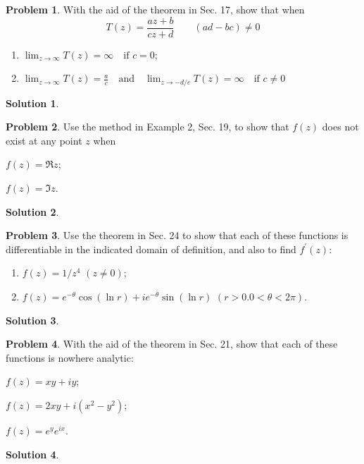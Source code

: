 \documentclass[10pt]{article}
\theoremstyle{definition}
\newtheorem{problem}{Problem}
\newtheorem{soln}{Solution}
\newcommand{\primed}[1]{#1^\prime}
\begin{document}
\begin{problem}
With the aid of the theorem in Sec. 17, show that when
$$T(z)=\frac{az+b}{cz+d}\qquad (ad-bc)\neq0$$
\begin{enumerate}[label=(\alph*)]
  \item $\lim_{z\to\infty}T(z)=\infty\quad \text{if } c=0$;
  \item $\lim_{z\to\infty}T(z)=\frac{a}{c}\quad\text{and}\quad\lim_{z\to-d/c}T(z)=\infty\quad\text{if } c\neq 0$
\end{enumerate}
\end{problem}
\begin{soln}
\end{soln}

\begin{problem}
Use the method in Example 2, Sec. 19, to show that $f(z)$ does not exist at any point
$z$ when
\begin{enumerate*}[label=(\alph*)]
  \item $f(z)=\Re z$;\qquad~
  \item $f(z)=\Im z$.
\end{enumerate*}
\end{problem}
\begin{soln}
\end{soln}

\begin{problem}
Use the theorem in Sec. 24 to show that each of these functions is differentiable in the
indicated domain of definition, and also to find $\primed{f}(z)$:
\begin{enumerate}[label=(\alph*)]
  \item $f(z)=1/z^4$ $(z\neq 0)$;
  \item $f(z)=e^{-\theta}\cos\left(\ln r\right)+ie^{-\theta}\sin\left(\ln r\right)$ $(r>0. 0<\theta<2\pi)$.
\end{enumerate}
\end{problem}
\begin{soln}
\end{soln}

\begin{problem}
With the aid of the theorem in Sec. 21, show that each of these functions is nowhere
analytic:
\begin{enumerate*}[label=(\alph*)]
  \item $f(z)=xy+iy$;\qquad~
  \item $f(z)=2xy+i(x^2-y^2)$;\qquad~
  \item $f(z)=e^ye^{ix}$.
\end{enumerate*}
\end{problem}
\begin{soln}
\end{soln}
\end{document}
